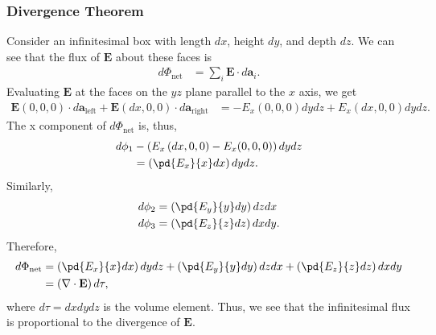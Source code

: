 \documentclass[10pt]{mypackage}
\begin{document}
\subsubsection{Divergence Theorem}%
Consider an infinitesimal box with length $dx$, height $dy$, and depth $dz$. We can see that the flux of $\mathbf{E}$ about these faces is
\begin{align*}
  d\Phi_{\text{net}} &= \sum_{i}\mathbf{E}\cdot d\mathbf{a}_i.
\end{align*}
Evaluating $\mathbf{E}$ at the faces on the $yz$ plane parallel to the $x$ axis, we get
\begin{align*}
  \mathbf{E}\left(0,0,0\right)\cdot d\mathbf{a}_{\text{left}} + \mathbf{E}\left(dx,0,0\right)\cdot d\mathbf{a}_{\text{right}} &= -E_x(0,0,0)dydz + E_x\left(dx,0,0\right)dydz.
\end{align*}
The x component of $d\Phi_{\text{net}}$ is, thus,
\begin{align*}
  d\phi_{1} &- \left(E_x\left(dx,0,0\right)- E_x(0,0,0)\right)dydz\\
            &= \left(\pd{E_x}{x}dx\right)dydz.
\end{align*}
Similarly,
\begin{align*}
  d\phi_2 &= \left(\pd{E_y}{y}dy\right)dzdx\\
  d\phi_3 &= \left(\pd{E_z}{z}dz\right)dxdy.
\end{align*}
Therefore, 
\begin{align*}
  d\Phi_{\text{net}} &= \left(\pd{E_x}{x}dx\right)dydz + \left(\pd{E_y}{y}dy\right)dzdx + \left(\pd{E_z}{z}dz\right)dxdy\\
                     &= \left(\nabla \cdot \mathbf{E}\right)d\tau,
\end{align*}
where $d\tau = dxdydz$ is the volume element. Thus, we see that the infinitesimal flux is proportional to the divergence of $\mathbf{E}$.\newline
\end{document}
